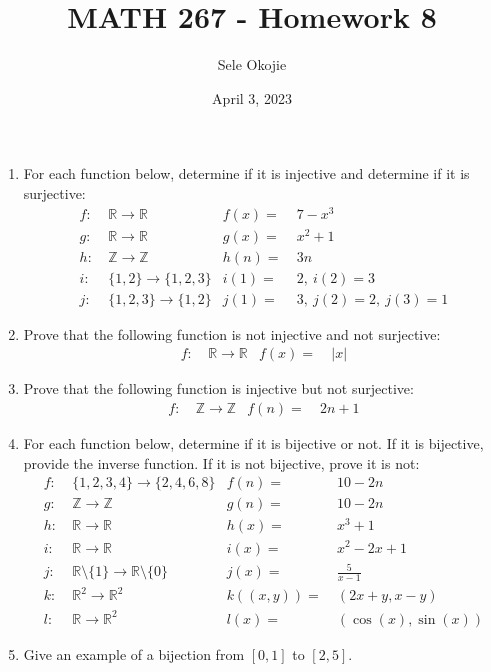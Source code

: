 \documentclass{article}
\title{MATH 267 - Homework 8}
\author{Sele Okojie}
\date{April 3, 2023}
\begin{document}
    \maketitle

    \begin{enumerate}
	\item For each function below, determine if it is injective and determine if it is surjective:
		\begin{align*}
			f : & \ \mathbb{R} \rightarrow \mathbb{R} & f(x) = & \ 7 - x^3 \\
			g : & \ \mathbb{R} \rightarrow \mathbb{R} & g(x) = & \ x^2 + 1 \\
			h : & \ \mathbb{Z} \rightarrow \mathbb{Z} & h(n) = & \ 3n \\
			i : & \ \{ 1, 2 \} \rightarrow \{ 1, 2, 3 \} & i(1) = & \ 2, \ i(2) = 3 \\
			j : & \ \{ 1, 2, 3 \} \rightarrow \{ 1, 2 \} & j(1) = & \ 3, \ j(2) = 2, \ j(3) = 1
		\end{align*}
	\item Prove that the following function is not injective and not surjective:
		\begin{align*}
			f : & \ \mathbb{R} \rightarrow \mathbb{R} & f(x) = & \ |x|
		\end{align*}
	\item Prove that the following function is injective but not surjective:
		\begin{align*}
			f : & \ \mathbb{Z} \rightarrow \mathbb{Z} & f(n) = & \ 2n+1
		\end{align*}
	\item For each function below, determine if it is bijective or not.  If it is bijective, provide the inverse function.  If it is not bijective, prove it is not:
		\begin{align*}
			f : & \ \{ 1, 2, 3, 4 \} \rightarrow \{ 2, 4, 6, 8 \} & f(n) = & \ 10 - 2n \\
			g : & \ \mathbb{Z} \rightarrow \mathbb{Z} & g(n) = & \ 10 - 2n \\
			h : & \ \mathbb{R} \rightarrow \mathbb{R} & h(x) = & \ x^3 + 1 \\
			i : & \ \mathbb{R} \rightarrow \mathbb{R} & i(x) = & \ x^2 - 2x + 1 \\
			j : & \ \mathbb{R} \setminus \{ 1 \} \rightarrow \mathbb{R} \setminus \{ 0 \} & j(x) = & \ \frac{5}{x-1} \\
			k : & \ \mathbb{R}^2 \rightarrow \mathbb{R}^2 & k((x,y)) = & \ (2x+y, x-y) \\
			l : & \ \mathbb{R} \rightarrow \mathbb{R}^2 & l(x) = & \ (\cos(x), \sin(x))
		\end{align*}
	\item Give an example of a bijection from $[0,1]$ to $[2,5]$.
\end{enumerate}
\end{document}
